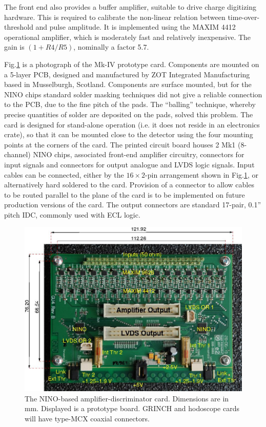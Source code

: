 \documentclass{article}
\begin{document}
The front end also provides a buffer amplifier, suitable to drive
charge digitizing hardware. This is required to calibrate the non-linear
relation between time-over-threshold and pulse amplitude. It is implemented
using the MAXIM 4412 operational amplifier, which is moderately fast
and relatively inexpensive. The gain is $(1+R4/R5)$, nominally a
factor 5.7.

Fig.\ref{fig:nino-photo} is a photograph of the Mk-IV prototype card.
Components are mounted on a 5-layer PCB, designed and manufactured
by ZOT Integrated Manufacturing based
in Musselburgh, Scotland. Components are surface mounted, but for
the NINO chips standard solder masking techniques did not give a reliable
connection to the PCB, due to the fine pitch of the pads. The ``balling''
technique, whereby precise quantities of solder are deposited on the
pads, solved this problem. The card is designed for stand-alone operation
(i.e. it does not reside in an electronics crate), so that it can
be mounted close to the detector using the four mounting points at
the corners of the card. The printed circuit board houses 2 Mk1 (8-channel)
NINO chips, associated front-end amplifier circuitry, connectors for
input signals and connectors for output analogue and LVDS logic signals.
Input cables can be connected, either by the $16\times2$-pin arrangement
shown in Fig.\ref{fig:nino-photo}, or alternatively hard soldered
to the card. Provision of a connector to allow cables to be routed
parallel to the plane of the card is to be implemented on future production
versions of the card. The output connectors are standard 17-pair,
0.1'' pitch IDC, commonly used with ECL logic.

\begin{figure}[h]
\includegraphics[width=1\columnwidth]{NINO/ReportJan14/NinoCardPhoto}

\protect\caption{\label{fig:nino-photo}The NINO-based amplifier-discriminator card.
Dimensions are in mm. Displayed is a prototype board. GRINCH and hodoscope
cards will have type-MCX coaxial connectors.}
\end{figure}
\end{document}

